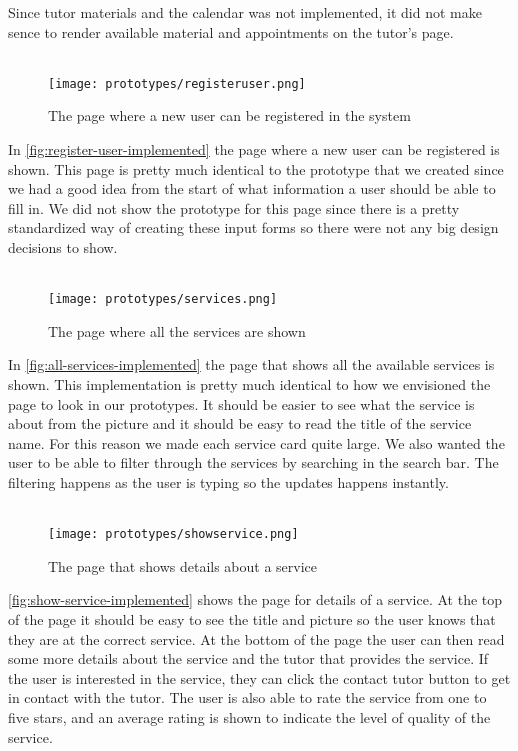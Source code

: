 Since tutor materials and the calendar was not implemented, it did not make sence to render available material and appointments on the tutor's page.
\\\\
\begin{figure}
    \centering
    \texttt{[image: prototypes/registeruser.png]} 
    \caption{The page where a new user can be registered in the system}
    \label{fig:register-user-implemented}
\end{figure}
\noindent
In \autoref{fig:register-user-implemented} the page where a new user can be registered is shown.
This page is pretty much identical to the prototype that we created since we had a good idea from the start of what information a user should be able to fill in. 
We did not show the prototype for this page since there is a pretty standardized way of creating these input forms so there were not any big design decisions to show.
\\\\
\begin{figure}
    \centering
    \texttt{[image: prototypes/services.png]}
    \caption{The page where all the services are shown}
    \label{fig:all-services-implemented}
\end{figure}
\noindent
In \autoref{fig:all-services-implemented} the page that shows all the available services is shown. 
This implementation is pretty much identical to how we envisioned the page to look in our prototypes. 
It should be easier to see what the service is about from the picture and it should be easy to read the title of the service name.
For this reason we made each service card quite large.
We also wanted the user to be able to filter through the services by searching in the search bar. 
The filtering happens as the user is typing so the updates happens instantly.
\\\\
\begin{figure}
    \centering
    \texttt{[image: prototypes/showservice.png]} 
    \caption{The page that shows details about a service}
    \label{fig:show-service-implemented}
\end{figure}
\noindent
\autoref{fig:show-service-implemented} shows the page for details of a service.
At the top of the page it should be easy to see the title and picture so the user knows that they are at the correct service.
At the bottom of the page the user can then read some more details about the service and the tutor that provides the service.
If the user is interested in the service, they can click the contact tutor button to get in contact with the tutor.
The user is also able to rate the service from one to five stars, and an average rating is shown to indicate the level of quality of the service.